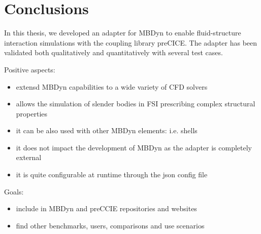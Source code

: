 \chapter{Conclusions}
\label{cha:conclusions}

In this thesis, we  developed an adapter for MBDyn to enable fluid-structure interaction simulations with the coupling library preCICE.
The adapter has been validated both qualitatively and quantitatively with several test cases.

Positive aspects:

\begin{itemize}
	\item extensd MBDyn capabilities to a wide variety of CFD solvers
	\item allows the simulation of slender bodies in FSI prescribing complex structural properties
	\item it can be also used with other MBDyn elements: i.e. shells
	\item it does not impact the development of MBDyn as the adapter is completely external
	\item it is quite configurable at runtime through the json config file
\end{itemize}


Goals:
\begin{itemize}
	\item include in MBDyn and preCCIE repositories and websites
	\item find other benchmarks, users, comparisons and use scenarios
\end{itemize}


